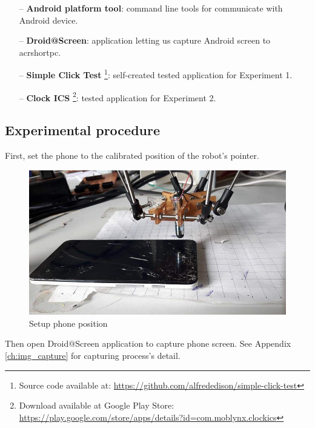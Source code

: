 	\begin{itemize}
		\item[--] \textbf{Android platform tool}: command line tools for communicate with Android device.
		\item[--] \textbf{Droid@Screen}: application letting us capture Android screen to acrshort{pc}.
		\item[--] \textbf{Simple Click Test} \footnote{Source code available at: \url{https://github.com/alfrededison/simple-click-test}}: self-created tested application for Experiment 1.
		\item[--] \textbf{Clock ICS} \footnote{Download available at Google Play Store: \url{https://play.google.com/store/apps/details?id=com.moblynx.clockics}}: tested application for Experiment 2.
	\end{itemize}

\subsection{Experimental procedure}
First, set the phone to the calibrated position of the robot's pointer.

	\begin{figure}[H]
		\centering
		\includegraphics[scale=0.5]{Chapters/Fig/phone_setup.jpg}
		\caption{Setup phone position}
		\label{fig:phone_setup}
	\end{figure}

Then open Droid@Screen application to capture phone screen. See Appendix \ref{ch:img_capture} for capturing process's detail.

